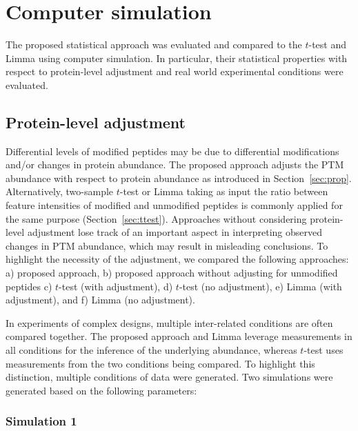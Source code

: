 \documentclass{mcp}
\def\secref#1{Section~\ref{#1}}
\begin{document}
\clearpage
\section{Computer simulation}
\label{sec:sim}

The proposed statistical approach was evaluated and compared to the $t$-test and Limma using computer simulation. In particular, their statistical properties with respect to protein-level adjustment and real world experimental conditions were evaluated.


\subsection{Protein-level adjustment}

Differential levels of modified peptides may be due to differential modifications and/or changes in protein abundance. The proposed approach adjusts the PTM abundance with respect to protein abundance as introduced in \secref{sec:prop}. Alternatively, two-sample $t$-test or Limma taking as input the ratio between feature intensities of modified and unmodified peptides is commonly applied for the same purpose (\secref{sec:ttest}). 
Approaches without considering protein-level adjustment lose track of an important aspect in interpreting observed changes in PTM abundance, which may result in misleading conclusions. To highlight the necessity of the adjustment, we compared the following approaches: a) proposed approach, b) proposed approach without adjusting for unmodified peptides c) $t$-test (with adjustment), d) $t$-test (no adjustment), e) Limma (with adjustment), and f) Limma (no adjustment).

In experiments of complex designs, multiple inter-related conditions are often compared together. The proposed approach and Limma leverage measurements in all conditions for the inference of the underlying abundance, whereas $t$-test uses measurements from the two conditions being compared. To highlight this distinction, multiple conditions of data were generated. Two simulations were generated based on the following parameters: 

\subsubsection{Simulation 1}
\end{document}
